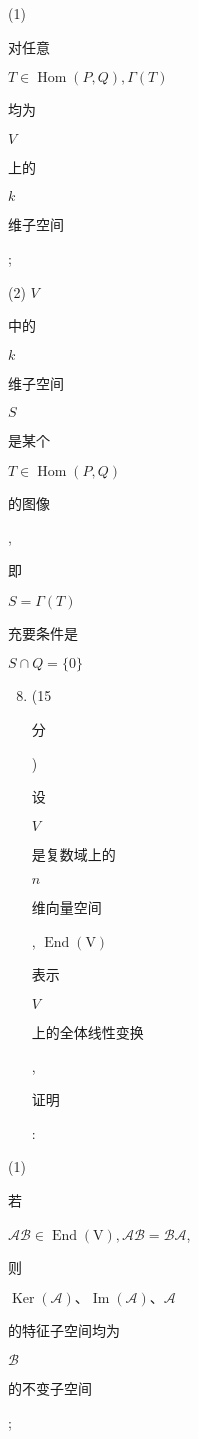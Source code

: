 \documentclass[10pt]{article}
\begin{document}
(1) \begin{CJK}{UTF8}{mj}对任意\end{CJK} $T \in \operatorname{Hom}(P, Q), \Gamma(T)$ \begin{CJK}{UTF8}{mj}均为\end{CJK} $V$ \begin{CJK}{UTF8}{mj}上的\end{CJK} $k$ \begin{CJK}{UTF8}{mj}维子空间\end{CJK};

(2) $V$ \begin{CJK}{UTF8}{mj}中的\end{CJK} $k$ \begin{CJK}{UTF8}{mj}维子空间\end{CJK} $S$ \begin{CJK}{UTF8}{mj}是某个\end{CJK} $T \in \operatorname{Hom}(P, Q)$ \begin{CJK}{UTF8}{mj}的图像\end{CJK}, \begin{CJK}{UTF8}{mj}即\end{CJK} $S=\Gamma(T)$ \begin{CJK}{UTF8}{mj}充要条件是\end{CJK} $S \cap Q=\{0\}$

\begin{enumerate}
  \setcounter{enumi}{7}
  \item (15 \begin{CJK}{UTF8}{mj}分\end{CJK}) \begin{CJK}{UTF8}{mj}设\end{CJK} $V$ \begin{CJK}{UTF8}{mj}是复数域上的\end{CJK} $n$ \begin{CJK}{UTF8}{mj}维向量空间\end{CJK}, $\operatorname{End}(\mathrm{V})$ \begin{CJK}{UTF8}{mj}表示\end{CJK} $V$ \begin{CJK}{UTF8}{mj}上的全体线性变换\end{CJK}, \begin{CJK}{UTF8}{mj}证明\end{CJK}:
\end{enumerate}
(1) \begin{CJK}{UTF8}{mj}若\end{CJK} $\mathscr{A} \mathscr{B} \in \operatorname{End}(\mathrm{V}), \mathscr{A} \mathscr{B}=\mathscr{B} \mathscr{A}$, \begin{CJK}{UTF8}{mj}则\end{CJK} $\operatorname{Ker}(\mathscr{A}) 、 \operatorname{Im}(\mathscr{A}) 、 \mathscr{A}$ \begin{CJK}{UTF8}{mj}的特征子空间均为\end{CJK} $\mathscr{B}$ \begin{CJK}{UTF8}{mj}的不变子空间\end{CJK};
\end{document}
